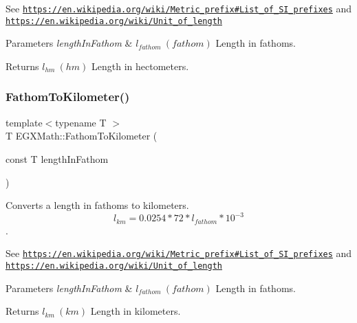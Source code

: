 See \href{https://en.wikipedia.org/wiki/Metric_prefix#List_of_SI_prefixes}{\tt https\+://en.\+wikipedia.\+org/wiki/\+Metric\+\_\+prefix\#\+List\+\_\+of\+\_\+\+S\+I\+\_\+prefixes} and \href{https://en.wikipedia.org/wiki/Unit_of_length}{\tt https\+://en.\+wikipedia.\+org/wiki/\+Unit\+\_\+of\+\_\+length} 
\begin{DoxyParams}{Parameters}
{\em length\+In\+Fathom} & $ l_{fathom}\ (fathom)$ Length in fathoms. \\
\hline
\end{DoxyParams}
\begin{DoxyReturn}{Returns}
$ l_{hm}\ (hm)$ Length in hectometers. 
\end{DoxyReturn}
\mbox{\label{group___e_g_x_math-_conversions-_length_conversions-_nautical-_fathom-_s_i_gaa94789483238000a82b01720546e84d7}} 
\subsubsection{\texorpdfstring{Fathom\+To\+Kilometer()}{FathomToKilometer()}}
{\footnotesize\ttfamily template$<$typename T $>$ \\
T E\+G\+X\+Math\+::\+Fathom\+To\+Kilometer (\begin{DoxyParamCaption}\item[{const T}]{length\+In\+Fathom }\end{DoxyParamCaption})}



Converts a length in fathoms to kilometers. \[ l_{km}=0.0254 * 72 * l_{fathom} * 10^{-3} \]. 

See \href{https://en.wikipedia.org/wiki/Metric_prefix#List_of_SI_prefixes}{\tt https\+://en.\+wikipedia.\+org/wiki/\+Metric\+\_\+prefix\#\+List\+\_\+of\+\_\+\+S\+I\+\_\+prefixes} and \href{https://en.wikipedia.org/wiki/Unit_of_length}{\tt https\+://en.\+wikipedia.\+org/wiki/\+Unit\+\_\+of\+\_\+length} 
\begin{DoxyParams}{Parameters}
{\em length\+In\+Fathom} & $ l_{fathom}\ (fathom)$ Length in fathoms. \\
\hline
\end{DoxyParams}
\begin{DoxyReturn}{Returns}
$ l_{km}\ (km)$ Length in kilometers. 
\end{DoxyReturn}
\mbox{\label{group___e_g_x_math-_conversions-_length_conversions-_nautical-_fathom-_s_i_ga143cda5a2c5c3914831736330058809b}} 

